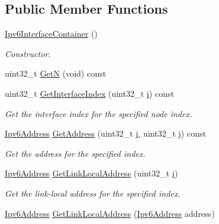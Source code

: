 \subsection*{Public Member Functions}
\begin{DoxyCompactItemize}
\item 
\hyperlink{classns3_1_1Ipv6InterfaceContainer_a2e941841c63656f442cbe1cc2bdf6861}{Ipv6\+Interface\+Container} ()
\begin{DoxyCompactList}\small\item\em Constructor. \end{DoxyCompactList}\item 
uint32\+\_\+t \hyperlink{classns3_1_1Ipv6InterfaceContainer_a47ccf3f11e14bc7d5d6262261e31d15e}{GetN} (void) const 
\item 
uint32\+\_\+t \hyperlink{classns3_1_1Ipv6InterfaceContainer_a6d786a88b25dce189628ef09a66691f2}{Get\+Interface\+Index} (uint32\+\_\+t \hyperlink{lte__uplink__power__control_8m_a6f6ccfcf58b31cb6412107d9d5281426}{i}) const 
\begin{DoxyCompactList}\small\item\em Get the interface index for the specified node index. \end{DoxyCompactList}\item 
\hyperlink{classns3_1_1Ipv6Address}{Ipv6\+Address} \hyperlink{classns3_1_1Ipv6InterfaceContainer_ac888a9b8e70b501e44fdb12e4adc7d79}{Get\+Address} (uint32\+\_\+t \hyperlink{lte__uplink__power__control_8m_a6f6ccfcf58b31cb6412107d9d5281426}{i}, uint32\+\_\+t j) const 
\begin{DoxyCompactList}\small\item\em Get the address for the specified index. \end{DoxyCompactList}\item 
\hyperlink{classns3_1_1Ipv6Address}{Ipv6\+Address} \hyperlink{classns3_1_1Ipv6InterfaceContainer_abc3ff3c728f42053c381d74ce4e103c3}{Get\+Link\+Local\+Address} (uint32\+\_\+t \hyperlink{lte__uplink__power__control_8m_a6f6ccfcf58b31cb6412107d9d5281426}{i})
\begin{DoxyCompactList}\small\item\em Get the link-\/local address for the specified index. \end{DoxyCompactList}\item 
\hyperlink{classns3_1_1Ipv6Address}{Ipv6\+Address} \hyperlink{classns3_1_1Ipv6InterfaceContainer_a80e63120102caaf616e953449c1e069c}{Get\+Link\+Local\+Address} (\hyperlink{classns3_1_1Ipv6Address}{Ipv6\+Address} address)

\end{DoxyCompactItemize}

